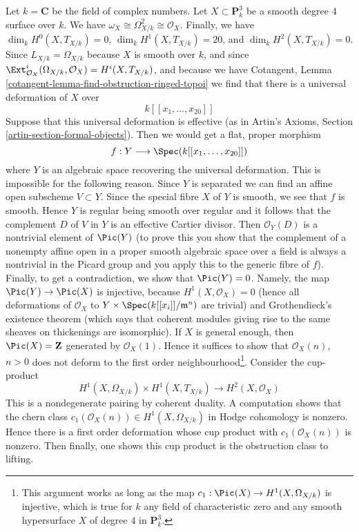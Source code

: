 \medskip\noindent
Let $k = \mathbf{C}$ be the field of complex numbers.
Let $X \subset \mathbf{P}^3_k$ be a smooth degree
$4$ surface over $k$. We have
$\omega_X \cong \Omega^2_{X/k} \cong \mathcal{O}_X$.
Finally, we have
$\dim_k H^0(X, T_{X/k}) = 0$,
$\dim_k H^1(X, T_{X/k}) = 20$, and
$\dim_k H^2(X, T_{X/k}) = 0$.
Since $L_{X/k} = \Omega_{X/k}$ because $X$ is smooth over $k$,
and since $\Ext^i_{\mathcal{O}_X}(\Omega_{X/k}, \mathcal{O}_X) =
H^i(X, T_{X/k})$, and because we have Cotangent, Lemma
\ref{cotangent-lemma-find-obstruction-ringed-topoi}
we find that there is a universal deformation of $X$
over
$$
k[[x_1, \ldots, x_{20}]]
$$
Suppose that this universal deformation is effective
(as in Artin's Axioms, Section \ref{artin-section-formal-objects}).
Then we would get a flat, proper morphism
$$
f : Y \longrightarrow \Spec(k[[x_1, \ldots, x_{20}]])
$$
where $Y$ is an algebraic space recovering the universal deformation.
This is impossible for the following reason. Since $Y$ is separated
we can find an affine open subscheme $V \subset Y$. Since the special
fibre $X$ of $Y$ is smooth, we see that $f$ is smooth. Hence $Y$
is regular being smooth over regular and it follows
that the complement $D$ of $V$ in $Y$ is an effective Cartier divisor.
Then $\mathcal{O}_Y(D)$ is a nontrivial element of $\Pic(Y)$
(to prove this you show that the complement of a nonempty affine open in
a proper smooth algebraic space over a field is always a nontrivial
in the Picard group and you apply this to the generic fibre of $f$).
Finally, to get a contradiction, we show that $\Pic(Y) = 0$.
Namely, the map $\Pic(Y) \to \Pic(X)$ is injective,
because $H^1(X, \mathcal{O}_X) = 0$ (hence all deformations of
$\mathcal{O}_X$ to $Y \times \Spec(k[[x_i]]/\mathfrak m^n)$
are trivial) and Grothendieck's existence theorem
(which says that coherent modules giving rise to the
same sheaves on thickenings are isomorphic).
If $X$ is general enough, then $\Pic(X) = \mathbf{Z}$
generated by $\mathcal{O}_X(1)$. Hence it suffices to show that
$\mathcal{O}_X(n)$, $n > 0$ does not deform to the first
order neighbourhood\footnote{This argument works as long as
the map $c_1 : \Pic(X) \to H^1(X, \Omega_{X/k})$
is injective, which is true for $k$ any field of characteristic zero
and any smooth hypersurface $X$ of degree $4$ in $\mathbf{P}^3_k$.}.
Consider the cup-product
$$
H^1(X, \Omega_{X/k}) \times H^1(X, T_{X/k})
\longrightarrow H^2(X, \mathcal{O}_X)
$$
This is a nondegenerate pairing by coherent duality.
A computation shows that the chern class
$c_1(\mathcal{O}_X(n)) \in H^1(X, \Omega_{X/k})$
in Hodge cohomology is nonzero.
Hence there is a first order deformation
whose cup product with $c_1(\mathcal{O}_X(n))$ is nonzero.
Then finally, one shows this cup product is the obstruction
class to lifting.


